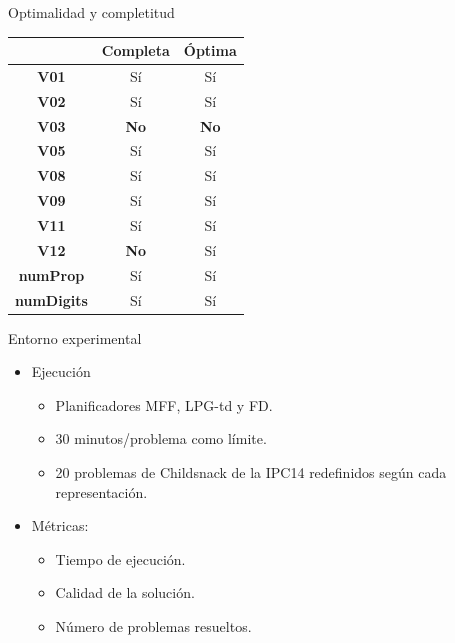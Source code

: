 \documentclass{beamer}
\begin{document}

\begin{frame}{Optimalidad y completitud}
    \begin{table}[]
\centering
\label{my-label}
\begin{tabular}{|c|c|c|}
\hline
\textbf{}          & \textbf{Completa} & \textbf{Óptima} \\ \hline
\textbf{V01}       & Sí                & Sí              \\ \hline
\textbf{V02}       & Sí                & Sí              \\ \hline
\textbf{V03}       & \textbf{No}                & \textbf{No}              \\ \hline
\textbf{V05}       & Sí                & Sí              \\ \hline
\textbf{V08}       & Sí                & Sí              \\ \hline
\textbf{V09}       & Sí                & Sí              \\ \hline
\textbf{V11}       & Sí                & Sí              \\ \hline
\textbf{V12}       & \textbf{No}                & Sí              \\ \hline
\textbf{numProp}   & Sí                & Sí              \\ \hline
\textbf{numDigits} & Sí                & Sí              \\ \hline
\end{tabular}
\end{table}
\end{frame}


\begin{frame}{Entorno experimental}
    \begin{itemize}
        \item Ejecución
        \begin{itemize}
            \item Planificadores MFF, LPG-td y FD.
            \item 30 minutos/problema como límite.
            \item 20 problemas de Childsnack de la IPC14 redefinidos según cada representación.
        \end{itemize}
        \item Métricas:
        \begin{itemize}
            \item Tiempo de ejecución.
            \item Calidad de la solución.
            \item Número de problemas resueltos.
        \end{itemize}
    \end{itemize}
\end{frame}
\end{document}
